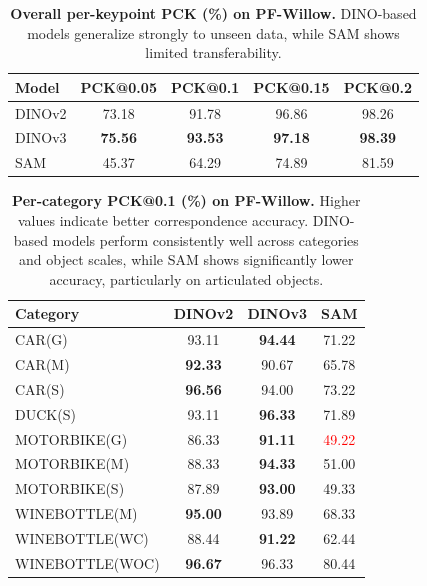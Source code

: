 \begin{table}[t]
    \centering
    \setlength{\tabcolsep}{3pt}
    \begin{tabular}{lcccc}
        \toprule
        Model & PCK@0.05 & PCK@0.1 & PCK@0.15 & PCK@0.2 \\
        \midrule
        DINOv2 & 73.18 & 91.78 & 96.86 & 98.26 \\
        DINOv3 & \textbf{75.56} & \textbf{93.53} & \textbf{97.18} & \textbf{98.39} \\
        SAM & 45.37 & 64.29 & 74.89 & 81.59 \\
        \bottomrule
    \end{tabular}
    \caption{
    \textbf{Overall per-keypoint PCK (\%) on PF-Willow.}
    DINO-based models generalize strongly to unseen data, while SAM shows limited transferability.
    }
    \label{tab:pfwillow_keypoint}
\end{table}


\begin{table}[t]
    \centering
    \setlength{\tabcolsep}{6pt}
    \begin{tabular}{lccc}
        \toprule
        Category & DINOv2 & DINOv3 & SAM \\
        \midrule
        CAR(G)          & 93.11 & \textbf{94.44} & 71.22 \\
        CAR(M)          & \textbf{92.33} & 90.67 & 65.78 \\
        CAR(S)          & \textbf{96.56} & 94.00 & 73.22 \\
        DUCK(S)         & 93.11 & \textbf{96.33} & 71.89 \\
        MOTORBIKE(G)    & 86.33 & \textbf{91.11} & \textcolor{red}{49.22} \\
        MOTORBIKE(M)    & 88.33 & \textbf{94.33} & 51.00 \\
        MOTORBIKE(S)    & 87.89 & \textbf{93.00} & 49.33 \\
        WINEBOTTLE(M)   & \textbf{95.00} & 93.89 & 68.33 \\
        WINEBOTTLE(WC)  & 88.44 & \textbf{91.22} & 62.44 \\
        WINEBOTTLE(WOC) & \textbf{96.67} & 96.33 & 80.44 \\
        \bottomrule
    \end{tabular}
    \caption{
    \textbf{Per-category PCK@0.1 (\%) on PF-Willow.}
    Higher values indicate better correspondence accuracy.
    DINO-based models perform consistently well across categories and object scales,
    while SAM shows significantly lower accuracy, particularly on articulated objects.
    }
    \label{tab:pfwillow_category}
\end{table}


